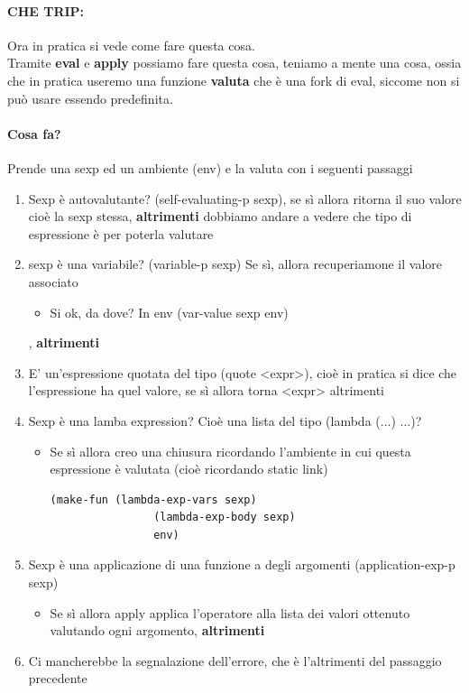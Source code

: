 \documentclass[12pt, a4paper, openany, oneside]{book}
\begin{document}
\paragraph{CHE TRIP:} Ora in pratica si vede come fare questa cosa.\\
Tramite \textbf{eval} e \textbf{apply} possiamo fare questa cosa, teniamo a mente
una cosa, ossia che in pratica useremo una funzione \textbf{valuta} che è una
fork di eval, siccome non si può usare essendo predefinita.
\paragraph{Cosa fa?} Prende una sexp ed un ambiente (env) e la valuta con i seguenti
passaggi
\begin{enumerate}
	\item Sexp è autovalutante? (self-evaluating-p sexp), se sì allora ritorna
	il suo valore cioè la sexp stessa, \textbf{altrimenti} dobbiamo andare a 
	vedere che tipo di espressione è per poterla valutare
	\item sexp è una variabile? (variable-p sexp) Se sì, allora recuperiamone
	il valore associato
	\begin{itemize}
		\item Si ok, da dove? In env (var-value sexp env)
	\end{itemize}, \textbf{altrimenti} 
	\item E' un'espressione quotata del tipo (quote <expr>), cioè in pratica si
	dice che l'espressione ha quel valore, se sì allora torna <expr> altrimenti
	\item Sexp è una lamba expression? Cioè una lista del tipo (lambda (...) ...)?
	\begin{itemize}
		\item Se sì allora creo una chiusura ricordando l'ambiente in cui 
		questa espressione è valutata (cioè ricordando static link)
		\begin{lstlisting}[language=LISP]
			(make-fun (lambda-exp-vars sexp) 
				(lambda-exp-body sexp)
				env)

		\end{lstlisting}
	\end{itemize}
	\item Sexp è una applicazione di una funzione a degli argomenti 
	(application-exp-p sexp)
	\begin{itemize}
		\item Se sì allora apply applica l'operatore alla lista dei valori ottenuto
		valutando ogni argomento, \textbf{altrimenti}
	\end{itemize}
	\item Ci mancherebbe la segnalazione dell'errore, che è l'altrimenti del 
	passaggio precedente
\end{enumerate}
\end{document}
